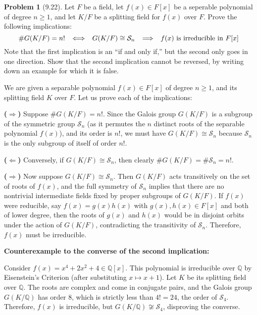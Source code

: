 \documentclass[12pt]{article}
\theoremstyle{definition}
\newtheorem{problem}{Problem}
\begin{document}
\begin{problem}[9.22]
    Let $F$ be a field, let $f(x) \in F[x]$ be a seperable polynomial of degree $n \geq 1$,
    and let $K/F$ be a splitting field for $f(x)$ over $F$. Prove the following implications:
    \[
        \#G(K/F) = n! \hspace{5px} \iff \hspace{5px} G(K/F) \cong \mathcal{S}_n \hspace{5px} \implies \hspace{5px} f(x) \text{ is irreducible in } F[x]
    \]
    Note that the first implication is an ``if and only if,'' but the second only goes in one direction. 
    Show that the second implication cannot be reversed, by writing down an example for which it is false.
    
    \begin{solution}
        We are given a separable polynomial $f(x) \in F[x]$ of degree $n \geq 1$, and its splitting field $K$ over $F$. Let us prove each of the implications:
        
        \textbf{($\Rightarrow$)} Suppose $\#G(K/F) = n!$. Since the Galois group $G(K/F)$ is a subgroup of the symmetric group $\mathcal{S}_n$ (as it permutes the $n$ distinct roots of the separable polynomial $f(x)$), and its order is $n!$, we must have $G(K/F) \cong \mathcal{S}_n$ because $\mathcal{S}_n$ is the only subgroup of itself of order $n!$.
        
        \textbf{($\Leftarrow$)} Conversely, if $G(K/F) \cong \mathcal{S}_n$, then clearly $\#G(K/F) = \#\mathcal{S}_n = n!$.
        
        \textbf{($\Rightarrow$)} Now suppose $G(K/F) \cong \mathcal{S}_n$. Then $G(K/F)$ acts transitively on the set of roots of $f(x)$, and the full symmetry of $\mathcal{S}_n$ implies that there are no nontrivial intermediate fields fixed by proper subgroups of $G(K/F)$. If $f(x)$ were reducible, say $f(x) = g(x)h(x)$ with $g(x), h(x) \in F[x]$ and both of lower degree, then the roots of $g(x)$ and $h(x)$ would be in disjoint orbits under the action of $G(K/F)$, contradicting the transitivity of $\mathcal{S}_n$. Therefore, $f(x)$ must be irreducible.
        
        \textbf{Counterexample to the converse of the second implication:}
        
        Consider $f(x) = x^4 + 2x^2 + 4 \in \mathbb{Q}[x]$. This polynomial is irreducible over $\mathbb{Q}$ by Eisenstein's Criterion (after substituting $x \mapsto x+1$). Let $K$ be its splitting field over $\mathbb{Q}$. The roots are complex and come in conjugate pairs, and the Galois group $G(K/\mathbb{Q})$ has order 8, which is strictly less than $4! = 24$, the order of $\mathcal{S}_4$. Therefore, $f(x)$ is irreducible, but $G(K/\mathbb{Q}) \not\cong \mathcal{S}_4$, disproving the converse.
        \end{solution}
\end{problem}
\end{document}

